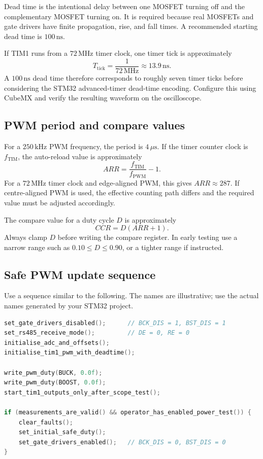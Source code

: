 \documentclass[11pt,a4paper]{article}
\begin{document}
Dead time is the intentional delay between one MOSFET turning off and the complementary MOSFET turning on. It is required because real MOSFETs and gate drivers have finite propagation, rise, and fall times. A recommended starting dead time is $100\,\mathrm{ns}$.

If TIM1 runs from a $72\,\mathrm{MHz}$ timer clock, one timer tick is approximately
\begin{equation}
  T_{\mathrm{tick}} = \frac{1}{72\,\mathrm{MHz}} \approx 13.9\,\mathrm{ns}.
\end{equation}
A $100\,\mathrm{ns}$ dead time therefore corresponds to roughly seven timer ticks before considering the STM32 advanced-timer dead-time encoding. Configure this using CubeMX and verify the resulting waveform on the oscilloscope.

\subsection{PWM period and compare values}

For a $250\,\mathrm{kHz}$ PWM frequency, the period is $4\,\mu\mathrm{s}$. If the timer counter clock is $f_{\mathrm{TIM}}$, the auto-reload value is approximately
\begin{equation}
  ARR = \frac{f_{\mathrm{TIM}}}{f_{\mathrm{PWM}}}-1.
\end{equation}
For a $72\,\mathrm{MHz}$ timer clock and edge-aligned PWM, this gives $ARR \approx 287$. If centre-aligned PWM is used, the effective counting path differs and the required value must be adjusted accordingly.

The compare value for a duty cycle $D$ is approximately
\begin{equation}
  CCR = D(ARR+1).
\end{equation}
Always clamp $D$ before writing the compare register. In early testing use a narrow range such as $0.10\leq D \leq 0.90$, or a tighter range if instructed.

\subsection{Safe PWM update sequence}

Use a sequence similar to the following. The names are illustrative; use the actual names generated by your STM32 project.

\begin{lstlisting}[language=C,caption={Guided PWM startup sequence}]
set_gate_drivers_disabled();      // BCK_DIS = 1, BST_DIS = 1
set_rs485_receive_mode();         // DE = 0, RE = 0
initialise_adc_and_offsets();
initialise_tim1_pwm_with_deadtime();

write_pwm_duty(BUCK, 0.0f);
write_pwm_duty(BOOST, 0.0f);
start_tim1_outputs_only_after_scope_test();

if (measurements_are_valid() && operator_has_enabled_power_test()) {
    clear_faults();
    set_initial_safe_duty();
    set_gate_drivers_enabled();   // BCK_DIS = 0, BST_DIS = 0
}
\end{lstlisting}
\end{document}
